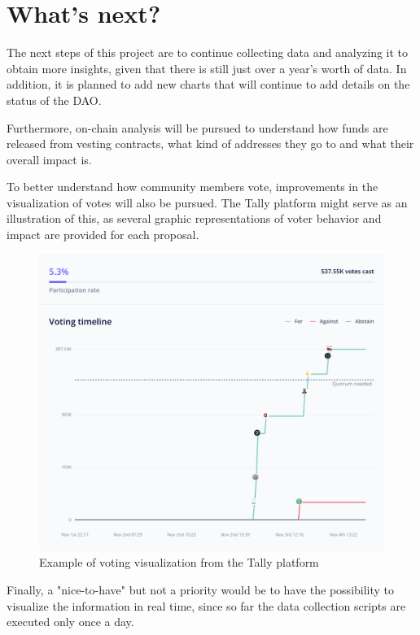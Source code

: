\documentclass[MSE,Master,english]{twbook}%
\begin{document}
\section{What's next?}
The next steps of this project are to continue collecting data and analyzing it to obtain more insights, given that there is still just over a year's worth of data. In addition, it is planned to add new charts that will continue to add details on the status of the DAO.

Furthermore, on-chain analysis will be pursued to understand how funds are released from vesting contracts, what kind of addresses they go to and what their overall impact is.

To better understand how community members vote, improvements in the visualization of votes will also be pursued. The Tally platform\cite{tally} might serve as an illustration of this, as several graphic representations of voter behavior and impact are provided for each proposal.

\begin{figure}[H]
  \centering
  \includegraphics[width=\textwidth]{votes_example.png}
  \caption{Example of voting visualization from the Tally platform}
  \label{fig:votes_example}
\end{figure}

Finally, a "nice-to-have" but not a priority would be to have the possibility to visualize the information in real time, since so far the data collection scripts are executed only once a day.
\end{document}
